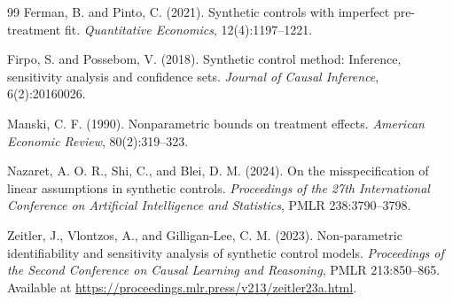 \documentclass[11pt]{article}
\theoremstyle{definition}
\theoremstyle{plain}
\theoremstyle{remark}
\begin{document}
\begin{thebibliography}{99}
Ferman, B. and Pinto, C. (2021).
Synthetic controls with imperfect pre-treatment fit.
\emph{Quantitative Economics}, 12(4):1197--1221.

Firpo, S. and Possebom, V. (2018).
Synthetic control method: Inference, sensitivity analysis and confidence sets.
\emph{Journal of Causal Inference}, 6(2):20160026.

Manski, C. F. (1990).
Nonparametric bounds on treatment effects.
\emph{American Economic Review}, 80(2):319--323.

Nazaret, A. O. R., Shi, C., and Blei, D. M. (2024).
On the misspecification of linear assumptions in synthetic controls.
\emph{Proceedings of the 27th International Conference on Artificial Intelligence and Statistics}, PMLR 238:3790--3798.

Zeitler, J., Vlontzos, A., and Gilligan-Lee, C. M. (2023).
Non-parametric identifiability and sensitivity analysis of synthetic control models.
\emph{Proceedings of the Second Conference on Causal Learning and Reasoning}, PMLR 213:850--865.
Available at \url{https://proceedings.mlr.press/v213/zeitler23a.html}.
\end{thebibliography}
\end{document}
